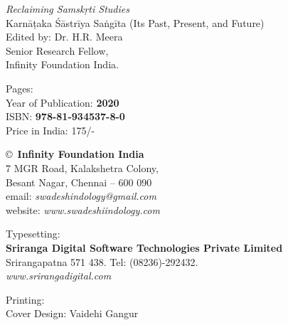 \thispagestyle{empty}

\noindent
{\fontsize{9}{11}\selectfont\sl Reclaiming Samskṛti Studies}\\
Karnāṭaka Śāstrīya Saṅgīta (Its Past, Present, and Future)\\
Edited by: Dr. H.R. Meera\\
Senior Research Fellow,\\
Infinity Foundation India.
\vfill

\noindent
Pages: {\bf\pageref{bookend}}\\
Year of Publication: {\bf 2020}\\
ISBN: {\bf 978-81-934537-8-0}\\
Price in India: 175/-
\vfill

\noindent
\copyright\ {\bf Infinity Foundation India}\\ 
7 MGR Road, Kalakshetra Colony,\\ 
Besant Nagar, Chennai -- 600 090\\
email: {\sl swadeshindology@gmail.com}\\
website: {\sl www.swadeshiindology.com} 
\vfill

\noindent
Typesetting:\\ 
{\bf Sriranga Digital Software Technologies Private Limited}\\ 
Srirangapatna 571 438. Tel: (08236)-292432.\\
{\sl www.srirangadigital.com}
\vfill

\noindent
Printing:\\

\noindent
Cover Design: Vaidehi Gangur\\ 

